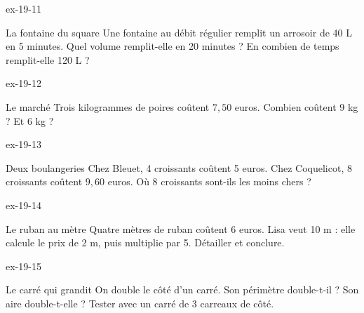 \begin{blocLivre}{ex-19-11}\begin{exercice}[3]{La fontaine du square}
Une fontaine au débit régulier remplit un arrosoir de 40 L en 5 minutes. Quel volume remplit-elle en 20 minutes ? En combien de temps remplit-elle 120 L ?
\end{exercice}\end{blocLivre}
\begin{blocLivre}{ex-19-12}\begin{exercice}[3]{Le marché}
Trois kilogrammes de poires coûtent $7{,}50$ euros. Combien coûtent 9 kg ? Et 6 kg ?
\end{exercice}\end{blocLivre}
\begin{blocLivre}{ex-19-13}\begin{exercice}[3]{Deux boulangeries}
Chez Bleuet, 4 croissants coûtent 5 euros. Chez Coquelicot, 8 croissants coûtent $9{,}60$ euros. Où 8 croissants sont-ils les moins chers ?
\end{exercice}\end{blocLivre}
\begin{blocLivre}{ex-19-14}\begin{exercice}[3]{Le ruban au mètre}
Quatre mètres de ruban coûtent 6 euros. Lisa veut 10 m : elle calcule le prix de 2 m, puis multiplie par 5. Détailler et conclure.
\end{exercice}\end{blocLivre}
\begin{blocLivre}{ex-19-15}\begin{exercice}[3]{Le carré qui grandit}
On double le côté d’un carré. Son périmètre double-t-il ? Son aire double-t-elle ? Tester avec un carré de 3 carreaux de côté.
\end{exercice}\end{blocLivre}

\clearpage
